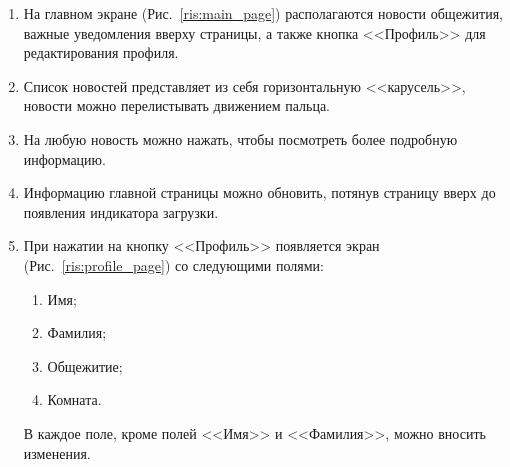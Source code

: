 \documentclass{../includes/TechDoc}
\begin{document}
    \begin{enumerate}
        \item На главном экране (Рис.~\ref{ris:main_page}) располагаются новости общежития, важные уведомления вверху страницы,
        а также кнопка <<Профиль>> для редактирования профиля.
        \item Список новостей представляет из себя горизонтальную <<карусель>>, новости можно перелистывать движением пальца.
        \item На любую новость можно нажать, чтобы посмотреть более подробную информацию.
        \item Информацию главной страницы можно обновить, потянув страницу вверх до появления индикатора загрузки.

        \item При нажатии на кнопку <<Профиль>> появляется экран (Рис.~\ref{ris:profile_page}) со следующими полями:
        \begin{enumerate}[noitemsep]
            \item Имя;
            \item Фамилия;
            \item Общежитие;
            \item Комната.
        \end{enumerate}
        В каждое поле, кроме полей <<Имя>> и <<Фамилия>>, можно вносить изменения.
        \begin{figure}[ht]
            \begin{center}
                \begin{minipage}[h]{0.33\linewidth}

\end{minipage}
\end{center}
\end{figure}
\end{enumerate}
\end{document}
